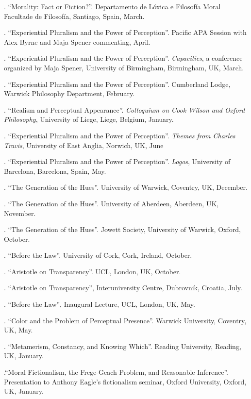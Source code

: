 \documentclass[11pt]{article}
\begin{document}
. ``Morality: Fact or Fiction?''. Departamento de Lóxica e Filosofía Moral
Facultade de Filosofía, Santiago, Spain, March.

. ``Experiential Pluralism and the Power of Perception''. Pacific APA Session with Alex Byrne and Maja Spener commenting, April.

. ``Experiential Pluralism and the Power of Perception''. \emph{Capacities}, a conference organized by Maja Spener, University of Birmingham, Birmingham, UK, March.

. ``Experiential Pluralism and the Power of Perception''. Cumberland Lodge, Warwick Philosophy Department, February.

. ``Realism and Perceptual Appearance''. \emph{Colloquium on Cook Wilson and Oxford Philosophy}, University of Liege, Liege, Belgium, January.

. ``Experiential Pluralism and the Power of Perception''. \emph{Themes from Charles Travis}, University of East Anglia, Norwich, UK, June

. ``Experiential Pluralism and the Power of Perception''. \emph{Logos}, University of Barcelona, Barcelona, Spain, May.

. ``The Generation of the Hues''. University of Warwick, Coventry, UK, December.

. ``The Generation of the Hues''. University of Aberdeen, Aberdeen, UK, November.

. ``The Generation of the Hues''. Jowett Society, University of Warwick, Oxford, October.

. ``Before the Law''. University of Cork, Cork, Ireland, October.

. ``Aristotle on Transparency''. UCL, London, UK, October.

. ``Aristotle on Transparency'', Interuniversity Centre, Dubrovnik, Croatia, July.

. ``Before the Law'', Inaugural Lecture, UCL, London, UK, May.

.  ``Color and the Problem of Perceptual Presence''. Warwick University, Coventry, UK, May.

. ``Metamerism, Constancy, and Knowing Which''. Reading University, Reading, UK, January.

.``Moral Fictionalism, the Frege-Geach Problem, and Reasonable Inference''. Presentation to Anthony Eagle's fictionalism seminar, Oxford University, Oxford, UK, January.
\end{document}
